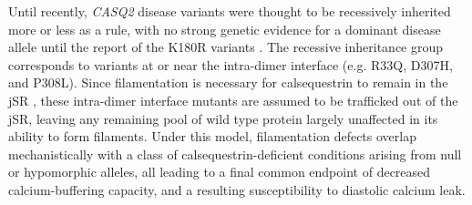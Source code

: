 Until recently, \textit{CASQ2} disease variants were thought to be recessively inherited more or less as a rule, with no strong genetic evidence for a dominant disease allele until the report of the K180R variants \supercite{Gray2016-kx}. The recessive inheritance group corresponds to variants at or near the intra-dimer interface (e.g. R33Q, D307H, and P308L). Since filamentation is necessary for calsequestrin to remain in the jSR \supercite{Milstein2009-ig,McFarland2010-yi,Knollmann2010-fl}, these intra-dimer interface mutants are assumed to be trafficked out of the jSR, leaving any remaining pool of wild type protein largely unaffected in its ability to form filaments. Under this model, filamentation defects overlap mechanistically with a class of calsequestrin-deficient conditions arising from null or hypomorphic alleles, all leading to a final common endpoint of decreased calcium-buffering capacity, and a resulting susceptibility to diastolic calcium leak.  


